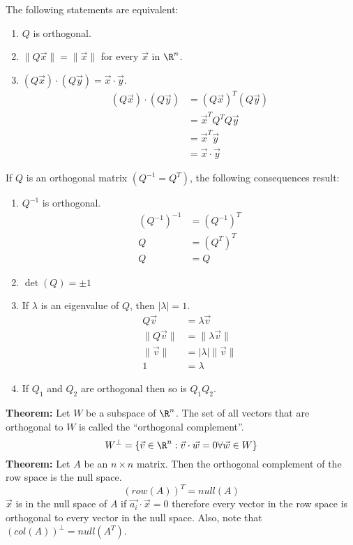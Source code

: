 \documentclass{math}
\begin{document}
The following statements are equivalent:
\begin{enumerate}
  \item \( Q \) is orthogonal.
  \item \( \|Q\vec{x}\| = \|\vec{x}\| \) for every \( \vec{x} \) in \( \R^n \).
  \item \( (Q\vec{x})\cdot(Q\vec{y}) = \vec{x}\cdot\vec{y} \).
  \begin{align*}
    (Q\vec{x})\cdot(Q\vec{y}) &= (Q\vec{x})^T(Q\vec{y}) \\
    &= \vec{x}^TQ^TQ\vec{y} \\
    &= \vec{x}^T\vec{y} \\
    &= \vec{x}\cdot\vec{y}
  \end{align*}
\end{enumerate}
If \( Q \) is an orthogonal matrix \( (Q^{-1} = Q^T) \), the following
consequences result:
\begin{enumerate}
  \item \( Q^{-1} \) is orthogonal.
  \begin{align*}
    (Q^{-1})^{-1} &= (Q^{-1})^T \\
    Q &= (Q^T)^T \\
    Q &= Q
  \end{align*}
  \item \( \det(Q) = \pm1 \)
  \item If \( \lambda \) is an eigenvalue of \( Q \), then \( |\lambda| = 1 \).
  \begin{align*}
    Q\vec{v} &= \lambda\vec{v} \\
    \|Q\vec{v}\| &= \|\lambda\vec{v}\| \\
    \|\vec{v}\| &= |\lambda|\|\vec{v}\| \\
    1 &= \lambda
  \end{align*}
  \item If \( Q_1 \) and \( Q_2 \) are orthogonal then so is \( Q_1Q_2 \).
\end{enumerate}
\textbf{Theorem:} Let \( W \) be a subspace of \( \R^n \). The set of all
vectors that are orthogonal to \( W \) is called the ``orthogonal complement''.
\[ W^{\bot} = \{\vec{v}\in\R^n:\vec{v}\cdot\vec{w} = 0 \forall\vec{w}\in W\} \]
\textbf{Theorem:} Let \( A \) be an \( n\times n \) matrix. Then the orthogonal
complement of the row space is the null space.
\[ (row(A))^T = null(A) \]
\( \vec{x} \) is in the null space of \( A \) if \( \vec{a_i}\cdot\vec{x} = 0 \)
therefore every vector in the row space is orthogonal to every vector in the
null space. Also, note that \( (col(A))^{\bot} = null(A^T) \).
\end{document}
